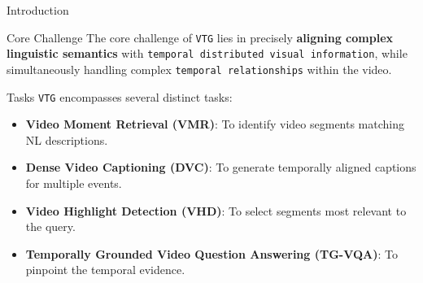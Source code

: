\begin{frame}{Introduction}
    \begin{block}{Core Challenge}
        The core challenge of \texttt{VTG} lies in precisely \textbf{aligning complex linguistic semantics} with \texttt{temporal distributed visual information}, while simultaneously handling complex \texttt{temporal relationships} within the video.
    \end{block}
    \begin{block}{Tasks}
        \texttt{VTG} encompasses several distinct tasks:

        \begin{itemize}
            \item \textbf{Video Moment Retrieval (VMR)}: To identify video segments matching NL descriptions.
            \item \textbf{Dense Video Captioning (DVC)}: To generate temporally aligned captions for multiple events.
            \item \textbf{Video Highlight Detection (VHD)}: To select segments most relevant to the query.
            \item \textbf{Temporally Grounded Video Question Answering (TG-VQA)}: To pinpoint the temporal evidence.
        \end{itemize}
    \end{block}
\end{frame}

